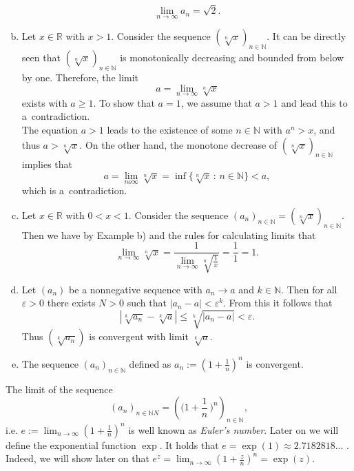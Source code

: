 \begin{example}{}
\begin{enumerate}[a)]
\[\lim_{n\to\infty}a_n=\sqrt{2}.\]
\item Let $x\in\mathbb{R}$ with $x>1$. Consider the sequence $(\sqrt[n]{x})_{n\in\mathbb{N}}$. It can be directly seen that $(\sqrt[n]{x})_{n\in\mathbb{N}}$ is monotonically decreasing and bounded from below by one. Therefore, the limit
\[a=\lim_{n\to\infty}\sqrt[n]{x}\]
exists with $a\geq1$. To show that $a=1$, we assume that $a>1$ and lead this to a~contradiction.\\
         The equation $a>1$ leads to the existence of some $n\in\mathbb{N}$ with $a^n>x$, and thus $a>\sqrt[n]{x}$. On the other hand, the monotone decrease of $(\sqrt[n]{x})_{n\in\mathbb{N}}$ implies that
\[a=\lim_{n	o\infty}\sqrt[n]{x}=\inf\{\sqrt[n]{x}\,:\,n\in\mathbb{N}\}<a,\]
which is a~contradiction.
\item Let $x\in\mathbb{R}$ with $0< x<1$. Consider the sequence $(a_n)_{n\in\mathbb{N}}=(\sqrt[n]{x})_{n\in\mathbb{N}}$. Then we have by Example b) and the rules for calculating limits that
\[\lim_{n\to\infty}\sqrt[n]{x}=\frac1{\lim_{n\to\infty}\sqrt[n]{\frac1x}}=\frac11=1.\]
\item Let $(a_{n})$ be a nonnegative sequence with $a_{n}\rightarrow a$ and $k\in\mathbb{N}$. Then for all $\varepsilon>0$ there exists $N>0$ such that $|a_{n}-a|<\varepsilon^{k}$. From this it follows that
$$
|\sqrt[k]{a_{n}}-\sqrt[k]{a}|\leq \sqrt[k]{|a_{n}-a|}<\varepsilon.
$$
Thus $(\sqrt[k]{a_{n}})$ is convergent with limit $\sqrt[k]{a}$.\\
\item The sequence $(a_{n})_{n\in\mathbb{N}}$ defined as $a_{n} := \left(1+\frac{1}{n}\right)^{n}$ is convergent.\\
\end{enumerate}
\end{example}

\begin{Remark}{}
The limit of the sequence \[(a_n)_{n \in \mathbb{N}N} = \left(  \Big(1+\frac{1}{n} \,\Big)^{n}\right)_{n \in \mathbb{N}},\] 
i.e. $e:=\lim_{n\rightarrow\infty}\left(1+\frac{1}{n}\right)^{n}$ is well known as \textit{Euler's number}. Later on we will define the exponential function $\exp$. It holds that $e=\exp(1)\approx 2.7182818...$ . Indeed, we will show later on that $e^{z}=\lim_{n\rightarrow\infty}\left(1+\frac{z}{n}\right)^{n}=\exp(z)$.
\end{Remark}

